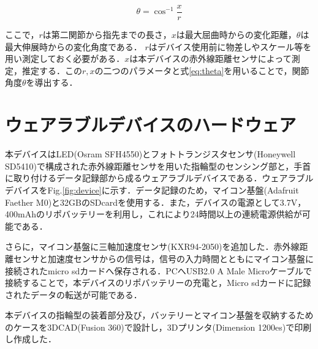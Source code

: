 \begin{equation}
\theta = \cos^{-1} \frac{x}{r}
\label{eq:theta}
\end{equation}


ここで，$r$は第二関節から指先までの長さ，$x$は最大屈曲時からの変化距離，$\theta$は最大伸展時からの変化角度である．
$r$はデバイス使用前に物差しやスケール等を用い測定しておく必要がある．$x$は本デバイスの赤外線距離センサによって測定，推定する．この$r,x$の二つのパラメータと式\ref{eq:theta}を用いることで，関節角度$\theta$を導出する．


\section{ウェアラブルデバイスのハードウェア}
本デバイスはLED(Osram SFH4550)とフォトトランジスタセンサ(Honeywell SD5410)で構成された赤外線距離センサを用いた指輪型のセンシング部と，手首に取り付けるデータ記録部から成るウェアラブルデバイスである．ウェアラブルデバイスをFig.\ref{fig:device}に示す．データ記録のため，マイコン基盤(Adafruit Faether M0)と32GBのSDcardを使用する．また，デバイスの電源として3.7V，400mAhのリポバッテリーを利用し，これにより24時間以上の連続電源供給が可能である．

さらに，マイコン基盤に三軸加速度センサ(KXR94-2050)を追加した．赤外線距離センサと加速度センサからの信号は，信号の入力時間とともにマイコン基盤に接続されたmicro sdカードへ保存される．PCへUSB2.0 A Male Microケーブルで接続することで，本デバイスのリポバッテリーの充電と，Micro sdカードに記録されたデータの転送が可能である．

本デバイスの指輪型の装着部分及び，バッテリーとマイコン基盤を収納するためのケースを3DCAD(Fusion 360)で設計し，3Dプリンタ(Dimension 1200es)で印刷し作成した．


